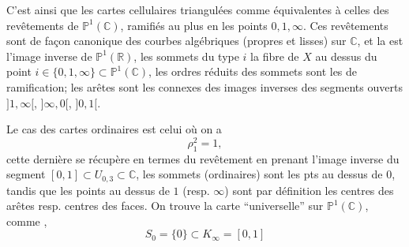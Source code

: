 
C'est ainsi que les  cartes cellulaires triangulées   comme équivalentes à celles des  revêtements  de \unsure{$\ast$} $\mathbb P^1(\mathbb C)$, ramifiés au plus en les points $0,1,\infty$. Ces revêtements sont de façon canonique des courbes algébriques (propres et lisses) sur $\mathbb C$, et la   est l'image inverse de  $\mathbb P^1(\mathbb R)$, les sommets du type $i$   la fibre de $X$ au dessus du point $i\in\{0,1,\infty\}\subset\mathbb P^1(\mathbb C)$, les ordres réduits des sommets sont les  de ramification; les arêtes sont les  connexes des images inverses des segments ouverts $]1,\infty[$, $]\infty,0[$, $]0,1[$.

Le cas des  cartes ordinaires est celui où on a
\[
\rho_1^2=1,
\]
cette dernière se récupère en termes du revêtement en prenant l'image inverse du segment $[0,1]\subset U_{0,3}\subset\mathbb C$, les sommets (ordinaires) sont les pts au dessus de $0$, tandis que les points au dessus de $1$ (resp. $\infty$) sont par définition les centres des arêtes resp. centres des faces. On trouve la carte  ``universelle''  sur $\mathbb P^1(\mathbb C)$, comme ,
\[
S_0=\{0\}\subset K_\infty=[0,1]
\]
